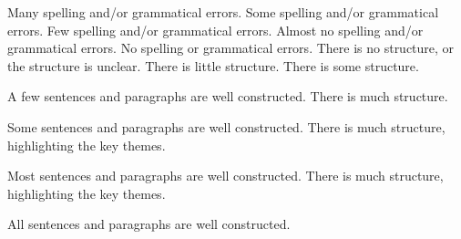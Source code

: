 \documentclass{../../fal_assignment}
\begin{document}
\begin{markingrubric}
        \grade 		Many spelling and/or grammatical errors.
        \grade 		Some spelling and/or grammatical errors.  
        \grade 		Few spelling and/or grammatical errors.
        \grade 		Almost no spelling and/or grammatical errors.
        \grade 		No spelling or grammatical errors.
%
        \grade\fail 	There is no structure, or the structure is unclear.
        \grade 		There is little structure.
        \grade 		There is some structure.
        \par 		A few sentences and paragraphs are well constructed.
        \grade 		There is much structure.
        \par 		Some sentences and paragraphs are well constructed.
        \grade 		There is much structure, highlighting the key themes.
        \par 		Most sentences and paragraphs are well constructed.
        \grade 		There is much structure, highlighting the key themes.
        \par 		All sentences and paragraphs are well constructed.
\end{markingrubric}
\end{document}
